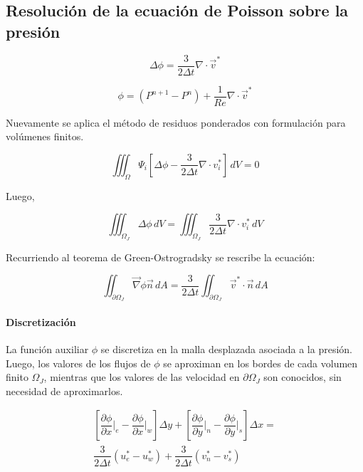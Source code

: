 \subsection{Resolución de la ecuación de Poisson sobre la presión}

\begin{equation}
\Delta \phi = \dfrac{3}{2 \Delta t} \nabla \cdot \vec{v}^*
\end{equation}

\begin{equation}
\phi = \left( P^{n+1} - P^n \right) + \dfrac{1}{Re} \nabla \cdot \vec{v}^* 
\end{equation}

Nuevamente se aplica el método de residuos ponderados con formulación para volúmenes finitos.

\begin{equation}
\iiint_{\Omega} \Psi_i  \left[ \Delta \phi - \dfrac{3}{2 \Delta t} \nabla \cdot v_i^* \right] \, dV = 0
\end{equation}

Luego,

\begin{equation}
\iiint_{\Omega_J} \Delta \phi \, dV = \iiint_{\Omega_J} \dfrac{3}{2 \Delta t} \nabla \cdot v_i^* \, dV
\end{equation}

Recurriendo al teorema de Green-Ostrogradsky se rescribe la ecuación:

\begin{equation}
\iint_{\partial \Omega_J} \vec{\nabla} \phi \vec{n} \, dA = \dfrac{3}{2 \Delta t} \iint_{\partial \Omega_J} \vec{v}^* \cdot \vec{n} \, dA
\end{equation}

\paragraph{Discretización} La función auxiliar $\phi$ se discretiza en la malla desplazada asociada a la presión. Luego, los valores de los flujos de $\phi$ se aproximan en los bordes de cada volumen finito $\Omega_J$, mientras que los valores de las velocidad en $\partial \Omega_J$ son conocidos, sin necesidad de aproximarlos.

\begin{equation}
\begin{split}
\left[ \dfrac{\partial \phi}{\partial x} \Big|_e - \dfrac{\partial \phi}{\partial x} \Big|_w \right] \Delta y + \left[ \dfrac{\partial \phi}{\partial y} \Big|_n - \dfrac{\partial \phi}{\partial y} \Big|_s \right] \Delta x = \\ \dfrac{3}{2 \Delta t} \left( u^*_e - u_w^*  \right) + \dfrac{3}{2 \Delta t} \left( v^*_n - v_s^*  \right)
\end{split}
\end{equation}

